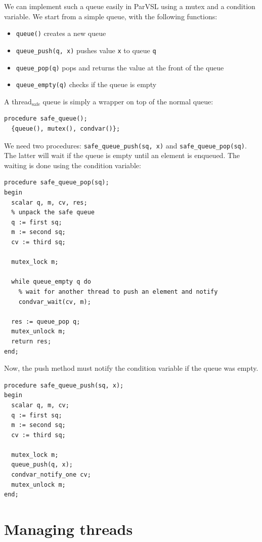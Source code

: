 We can implement such a queue easily in ParVSL using a mutex and a condition variable. We start
from a simple queue, with the following functions:

\begin{itemize}
\item \texttt{queue()} creates a new queue
\item \texttt{queue\_push(q, x)} pushes value \texttt{x} to queue \texttt{q}
\item \texttt{queue\_pop(q)} pops and returns the value at the front of the queue
\item \texttt{queue\_empty(q)} checks if the queue is empty
\end{itemize}

A thread\(_{\text{safe}}\) queue is simply a wrapper on top of the normal queue:
\begin{verbatim}
procedure safe_queue();
  {queue(), mutex(), condvar()};
\end{verbatim}

We need two procedures: \texttt{safe\_queue\_push(sq, x)} and \texttt{safe\_queue\_pop(sq)}. The latter will
wait if the queue is empty until an element is enqueued. The waiting is done using the condition variable:

\begin{verbatim}
procedure safe_queue_pop(sq);
begin
  scalar q, m, cv, res;
  % unpack the safe queue
  q := first sq;
  m := second sq;
  cv := third sq;

  mutex_lock m;

  while queue_empty q do
    % wait for another thread to push an element and notify
    condvar_wait(cv, m);

  res := queue_pop q;
  mutex_unlock m;
  return res;
end;
\end{verbatim}

Now, the push method must notify the condition variable if the queue was empty.
\begin{verbatim}
procedure safe_queue_push(sq, x);
begin
  scalar q, m, cv;
  q := first sq;
  m := second sq;
  cv := third sq;

  mutex_lock m;
  queue_push(q, x);
  condvar_notify_one cv;
  mutex_unlock m;
end;
\end{verbatim}


\section{Managing threads}


